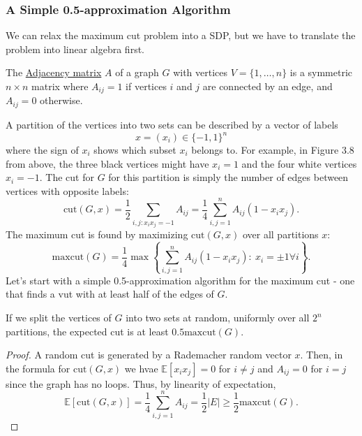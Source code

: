 \subsubsection{A Simple 0.5-approximation Algorithm}
We can relax the maximum cut problem into a SDP, but we have to translate the problem into linear algebra first.

\begin{definition}[]
\label{def:3.6.2}
The \underline{Adjacency matrix} $A$ of a graph $G$ with vertices $V = \{1, \dots, n\}$ is a symmetric 
$n \times n$ matrix where $A_{ij} = 1$ if vertices $i$ and $j$ are connected by an edge, and $A_{ij} = 0$ 
otherwise.
\end{definition}

A partition of the vertices into two sets can be described by a vector of labels 
\[ x = (x_i) \in \{-1, 1\}^n \]
where the sign of $x_i$ shows which subset $x_i$ belongs to. For example, in Figure 3.8 from above, the three 
black vertices might have $x_i = 1$ and the four white vertices $x_i = -1$. The cut for $G$ for this partition 
is simply the number of edges between vertices with opposite labels:
\[ \mathrm{cut}(G, x) = \frac{1}{2}\sum_{i, j: x_ix_j = -1}^{} A_{ij} 
= \frac{1}{4} \sum_{i, j = 1}^{n} A_{ij}(1 - x_ix_j). \]
The maximum cut is found by maximizing $\mathrm{cut}(G, x)$ over all partitions $x$: 
\[ \mathrm{maxcut}(G) = \frac{1}{4} \max_{}\left\{ \sum_{i, j = 1}^{n} A_{ij}(1 - x_ix_j): \ x_i = \pm 1 
\forall i\right\}. \]
Let's start with a simple 0.5-approximation algorithm for the maximum cut - one that finds a vut with at least 
half of the edges of $G$.

\begin{proposition}
\label{prop:3.6.3}
If we split the vertices of $G$ into two sets at random, uniformly over all $2^n$ partitions, the expected cut 
is at least $0.5 \mathrm{maxcut}(G)$.
\end{proposition}

\begin{proof}
A random cut is generated by a Rademacher random vector $x$. Then, in the formula for $\mathrm{cut}(G, x)$ 
we hvae $\mathbb{E}\left[ x_ix_j \right] = 0$ for $i \neq j$ and $A_{ij} = 0$ for $i = j$ since the graph has 
no loops. Thus, by linearity of expectation, 
\[ \mathbb{E}\left[ \mathrm{cut}(G, x) \right]
= \frac{1}{4} \sum_{i, j = 1}^{n} A_{ij} = \frac{1}{2}|E| \geq \frac{1}{2}\mathrm{maxcut}(G). \]
\end{proof}


